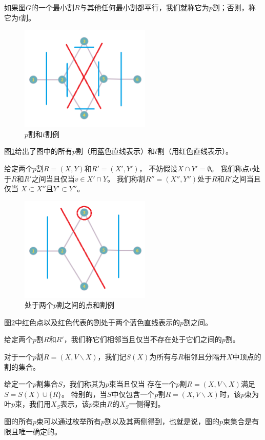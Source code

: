 \begin{definition}[$p$割与$t$割]
  如果图$G$的一个最小割$R$与其他任何最小割都平行，我们就称它为$p$割；否则，称它为$t$割。
\end{definition}
\begin{figure}[htb]
  \centering
    \includegraphics[height=5cm]{figures/graph008.png}
  \caption{$p$割和$t$割例}
  \label{ptcut}
\end{figure}
图\ref{ptcut}给出了图中的所有$p$割（用蓝色直线表示）和$t$割（用红色直线表示）。

\begin{definition}
  给定两个$p$割$R=(X,Y)$和$R'=(X',Y')$，
  不妨假设$X\cap Y'=\emptyset$。
  我们称点$v$处于$R$和$R'$之间当且仅当$v\in X'\cap Y$。
  我们称割$R''=(X'',Y'')$处于$R$和$R'$之间当且仅当 $X\subset X''$且$Y'\subset Y''$。
\end{definition}


\begin{figure}[htb]
  \centering
    \includegraphics[height=5cm]{figures/graph009.png}
  \caption{处于两个$p$割之间的点和割例}
  \label{between}
\end{figure}
图\ref{between}中红色点以及红色代表的割处于两个蓝色直线表示的$p$割之间。

\begin{definition}[相邻的$p$割]
  给定两个$p$割$R$和$R'$，我们称它们相邻当且仅当不存在处于它们之间的$p$割。
\end{definition}
对于一个$p$割$R=(X,V\backslash X)$，我们记$S(X)$为所有与$R$相邻且分隔开$X$中顶点的割的集合。
\begin{definition}[$p$束]
  给定一个$p$割集合$S$，我们称其为$p$束当且仅当
  存在一个$p$割$R=(X,V\backslash X)$满足$S=S(X)\cup \{R\}$。
  特别的，当$S$中仅包含一个$p$割$R=(X,V\backslash X)$时，该$p$束为叶$p$束，我们用$X_S$表示，该$p$束由$R$的$X_S$一侧得到。
\end{definition}
图的所有$p$束可以通过枚举所有$p$割以及其两侧得到，也就是说，图的$p$束集合是有限且唯一确定的。

